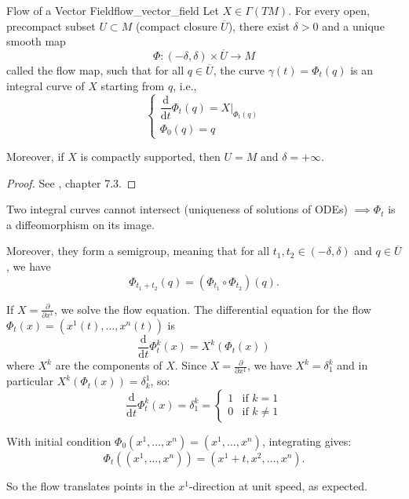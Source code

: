 \begin{colortheo}{Flow of a Vector Field}{flow_vector_field}
Let $X \in \Gamma(TM)$. For every open, precompact subset $U \subset M$ (compact closure $\overline{U}$), there exist $\delta > 0$ and a unique smooth map
\[
\Phi: (-\delta, \delta) \times \overline{U} \longrightarrow M
\]
called the flow map, such that for all $q \in \overline{U}$, the curve $\gamma(t) = \Phi_t(q)$ is an integral curve of $X$ starting from $q$, i.e.,
\[
\left\{
\begin{array}{l}
\dfrac{\mathrm{d}}{\mathrm{d}t} \Phi_t(q) = X|_{\Phi_t(q)} \\[0.3cm]
\Phi_0(q) = q
\end{array}
\right.
\]

Moreover, if $X$ is compactly supported, then $U = M$ and $\delta = +\infty$.
\end{colortheo}

\begin{proof}
See \cite{tsakanikas2024dg2}, chapter 7.3.
\end{proof}




\begin{colremark}
Two integral curves cannot intersect (uniqueness of solutions of ODEs) $\implies \Phi_t$ is a diffeomorphism on its image.
\end{colremark}

Moreover, they form a semigroup, meaning that for all $t_1, t_2 \in (-\delta, \delta)$ and $q \in \overline{U}$, we have
\[
\Phi_{t_1+t_2}(q)
= (\Phi_{t_1} \circ \Phi_{t_2})(q).
\]


\begin{colexample}{}{}
    \label{ex:flow_of_coordinate_vector_field}
If $X = \frac{\partial}{\partial x^1}$, we solve the flow equation. The differential equation for the flow $\Phi_t(x) = (x^1(t), \ldots, x^n(t))$ is
\[
\frac{\mathrm{d}}{\mathrm{d}t} \Phi_t^k(x) = X^k(\Phi_t(x))
\]
where $X^k$ are the components of $X$. Since $X = \frac{\partial}{\partial x^1}$, we have $X^k = \delta_1^k$ and in particular $X^k(\Phi_t(x))=\delta^1_k$, so:
\[
\frac{\mathrm{d}}{\mathrm{d}t} \Phi_t^k(x) = \delta_1^k = \begin{cases} 1 & \text{if } k=1 \\ 0 & \text{if } k \neq 1 \end{cases}
\]

With initial condition $\Phi_0(x^1, \ldots, x^n) = (x^1, \ldots, x^n)$, integrating gives:
\[
\Phi_t((x^1, \ldots, x^n)) = (x^1 + t, x^2, \ldots, x^n).
\]

So the flow translates points in the $x^1$-direction at unit speed, as expected.
\end{colexample}



